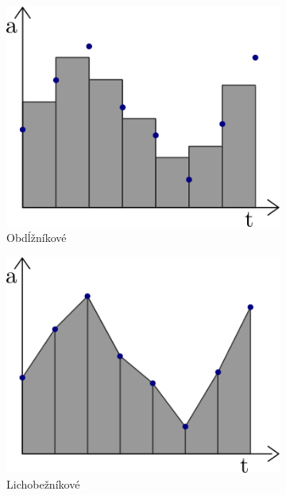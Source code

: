 \begin{figure}[h]
\centering
\begin{subfigure}[b]{0.32\textwidth}
    \centering
    \includegraphics[width=\textwidth]{figures/rectangular-rule.png}
    \caption{Obdĺžníkové}
\end{subfigure}
\hfill
\begin{subfigure}[b]{0.32\textwidth}
    \centering
    \includegraphics[width=\textwidth]{figures/trapezoidal-rule.png}
    \caption{Lichobežníkové}
\end{subfigure}
\hfill
\begin{subfigure}[b]{0.32\textwidth}

\end{subfigure}
\end{figure}
